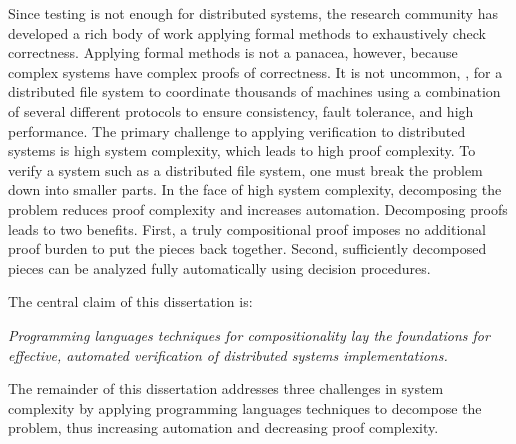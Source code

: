Since testing is not enough for distributed systems,
  the research community has developed
  a rich body of work applying formal methods
  to exhaustively check correctness.
Applying formal methods is not a panacea, however,
  because complex systems have complex proofs of correctness.
It is not uncommon, \eg,
  for a  distributed file system to coordinate thousands of machines
  using a combination of several different protocols to ensure
  consistency, fault tolerance, and high performance.
The primary challenge to applying verification to distributed systems is
  high system complexity, which leads to high proof complexity.
To verify a system such as a distributed file system,
  one must break the problem down into smaller parts.
In the face of high system complexity,
  decomposing the problem reduces proof complexity and increases automation.
Decomposing proofs leads to two benefits.
First, a truly compositional proof
  imposes no additional proof burden
  to put the pieces back together.
Second, sufficiently decomposed pieces can
  be analyzed fully automatically using decision procedures.

The central claim of this dissertation is:
\begin{center}
\emph{Programming languages techniques for compositionality
  lay the foundations for effective, automated verification of
  distributed systems implementations.
}
\end{center}

The remainder of this dissertation addresses three challenges in system complexity
  by applying programming languages techniques to decompose the problem,
  thus increasing automation and decreasing proof complexity.


